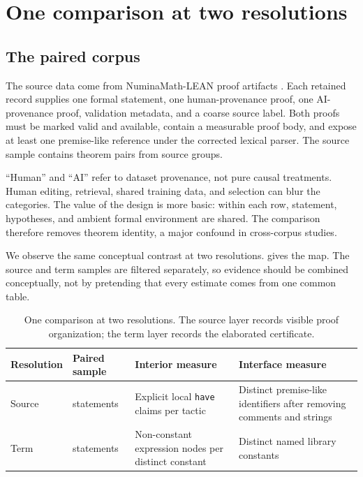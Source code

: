 \documentclass[11pt]{article}
\newcommand{\code}[1]{\texttt{#1}}
\begin{document}
\section{One comparison at two resolutions}

\subsection{The paired corpus}

The source data come from NuminaMath-LEAN proof artifacts \citep{numinamathlean}.  Each retained
record supplies one formal statement, one human-provenance proof, one AI-provenance proof, validation
metadata, and a coarse source label.  Both proofs must be marked valid and available, contain a
measurable proof body, and expose at least one premise-like reference under the corrected lexical
parser.  The source sample contains \SourcePairs{} theorem pairs from \SourceGroups{} source groups.

``Human'' and ``AI'' refer to dataset provenance, not pure causal treatments.  Human editing,
retrieval, shared training data, and selection can blur the categories.  The value of the design is
more basic: within each row, statement, hypotheses, and ambient formal environment are shared.  The
comparison therefore removes theorem identity, a major confound in cross-corpus studies.

We observe the same conceptual contrast at two resolutions.   gives the map.
The source and term samples are filtered separately, so evidence should be combined conceptually,
not by pretending that every estimate comes from one common table.

\begin{table}[t]
\centering
\caption{One comparison at two resolutions.  The source layer records visible proof organization;
the term layer records the elaborated certificate.}
\label{tab:measurement}
\small
\begin{tabularx}{\textwidth}{P{.10\textwidth}P{.18\textwidth}P{.28\textwidth}Y}
\toprule
Resolution & Paired sample & Interior measure & Interface measure \\
\midrule
Source & \SourcePairs{} statements & Explicit local \code{have} claims per tactic & Distinct
premise-like identifiers after removing comments and strings \\
Term & \TermPairs{} statements & Non-constant expression nodes per distinct constant &
Distinct named library constants \\
\bottomrule
\end{tabularx}
\end{table}
\end{document}
